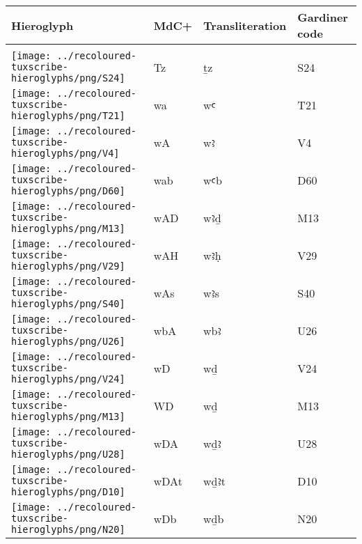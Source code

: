 \begin{center}
	\begin{tabularx}{\linewidth}{YYYY}
		Hieroglyph & MdC+ & Transliteration & Gardiner code\\
		\hline\\
		\texttt{[image: ../recoloured-tuxscribe-hieroglyphs/png/S24]} & Tz & ṯz & S24 \\ 
		\texttt{[image: ../recoloured-tuxscribe-hieroglyphs/png/T21]} & wa & wꜥ & T21 \\ 
		\texttt{[image: ../recoloured-tuxscribe-hieroglyphs/png/V4]} & wA & wꜣ & V4 \\ 
		\texttt{[image: ../recoloured-tuxscribe-hieroglyphs/png/D60]} & wab & wꜥb & D60 \\ 
		\texttt{[image: ../recoloured-tuxscribe-hieroglyphs/png/M13]} & wAD & wꜣḏ & M13 \\ 
		\texttt{[image: ../recoloured-tuxscribe-hieroglyphs/png/V29]} & wAH & wꜣḥ & V29 \\ 
		\texttt{[image: ../recoloured-tuxscribe-hieroglyphs/png/S40]} & wAs & wꜣs & S40 \\ 
		\texttt{[image: ../recoloured-tuxscribe-hieroglyphs/png/U26]} & wbA & wbꜣ & U26 \\ 
		\texttt{[image: ../recoloured-tuxscribe-hieroglyphs/png/V24]} & wD & wḏ & V24 \\ 
		\texttt{[image: ../recoloured-tuxscribe-hieroglyphs/png/M13]} & WD & wḏ & M13 \\ 
		\texttt{[image: ../recoloured-tuxscribe-hieroglyphs/png/U28]} & wDA & wḏꜣ & U28 \\ 
		\texttt{[image: ../recoloured-tuxscribe-hieroglyphs/png/D10]} & wDAt & wḏꜣt & D10 \\ 
		\texttt{[image: ../recoloured-tuxscribe-hieroglyphs/png/N20]} & wDb & wḏb & N20 \\ 
	\end{tabularx}
\end{center}


